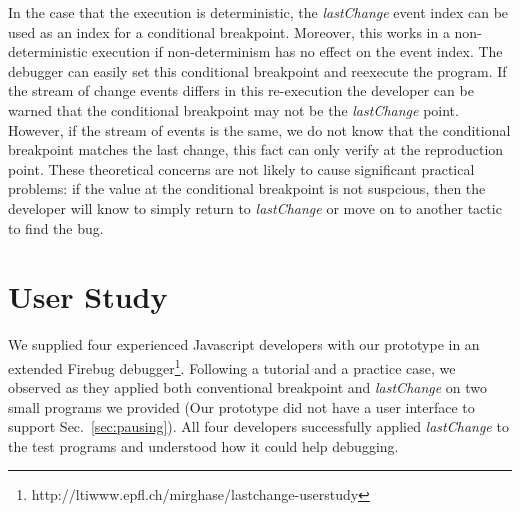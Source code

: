\documentclass{sig-alternate}
\begin{document}
In the case that the execution is deterministic, the \textit{lastChange}
event index can be used as an index for a conditional breakpoint. 
Moreover, this works in a non-deterministic execution if non-determinism
has no effect on the event index.  The debugger can easily set this conditional breakpoint
and reexecute the program. If the stream of change events differs in this re-execution the
developer can be warned that the conditional breakpoint may not be the \textit{lastChange} point.
However, if the stream of events is the same, we do not know that the 
conditional breakpoint matches the last 
change, this fact  can only verify  at the reproduction point. These theoretical concerns are not
likely to cause significant practical problems: if the value at the conditional breakpoint is not suspcious, 
then the developer will know to simply return to \textit{lastChange} or move on to another tactic to find the bug.




\section{User Study}
We supplied four experienced Javascript developers with our prototype in an 
extended Firebug debugger\footnote[5]{http://ltiwww.epfl.ch/\texttildelow mirghase/lastchange-userstudy}. Following a tutorial and a practice case, we observed as they 
applied both conventional breakpoint and \textit{lastChange} on two small programs we 
provided (Our prototype did not have a user interface to support Sec.~\ref{sec:pausing}).
All four developers successfully applied \textit{lastChange} to the test programs 
and understood how it could help debugging. 
\end{document}
